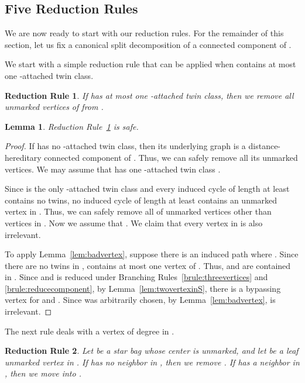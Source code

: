 \documentclass[11pt]{elsarticle}
\newtheorem{lemma}[theorem]{Lemma}
\newtheorem{RRULE}{Reduction Rule}
\begin{document}
\subsection{Five Reduction Rules}\label{subsec:sixrules}

We are now ready to start with our reduction rules. 
For the remainder of this section, let us fix a canonical split decomposition  of a connected component of .

We start with a simple reduction rule that can be applied when  contains at most one -attached twin class.
\begin{RRULE}\label{rrule:dhcomponent}
If  has at most one -attached twin class, then we remove all unmarked vertices of  from .
\end{RRULE}
\begin{lemma}
\label{lem:onesattached}
Reduction Rule~\ref{rrule:dhcomponent} is safe.
\end{lemma}

\begin{proof}
If  has no -attached twin class, then its underlying graph is a distance-hereditary connected component of .
Thus, we can safely remove all its unmarked vertices. We may assume that  has one -attached twin class .

Since  is the only -attached twin class and every induced cycle of length at least  contains no twins,
no induced cycle of length at least  contains an unmarked vertex in .
Thus, we can safely remove all of unmarked vertices other than vertices in .
Now we assume that . We claim that every vertex in  is also irrelevant.

To apply Lemma~\ref{lem:badvertex}, 
suppose there is an induced path
  where .
 Since there are no twins in , 
  contains at most one vertex of .
Thus,  and  are contained in . Since  and  is reduced under Branching Rules~\ref{brule:threevertices} and \ref{brule:reducecomponent}, 
by Lemma~\ref{lem:twovertexinS}, there is a bypassing vertex for  and .
Since  was arbitrarily chosen, by Lemma~\ref{lem:badvertex},  is irrelevant.
\end{proof}

The next rule deals with a vertex of degree  in .
 
\begin{RRULE}\label{rrule:leaftoS}
Let  be a star bag whose center is unmarked, and let  be a leaf unmarked vertex in . 
If  has no neighbor in , then we remove .
If  has a neighbor in , then we move  into .
\end{RRULE}
\end{document}
